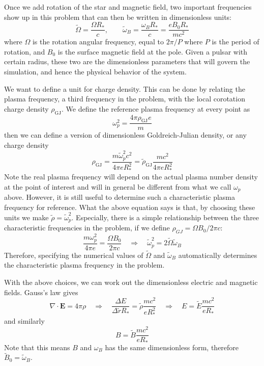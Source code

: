 Once we add rotation of the star and magnetic field, two important frequencies
show up in this problem that can then be written in dimensionless units:
\begin{equation}
  \tilde{\Omega} = \frac{\Omega R_{*}}{c},\qquad \tilde{\omega}_B = \frac{\omega_BR_{*}}{c} = \frac{e B_0R_{*}}{mc^2}
\end{equation}
where $\Omega$ is the rotation angular frequency, equal to $2\pi / P$ where $P$ is the period of rotation, and $B_0$ is the surface magnetic field at the pole. Given a pulsar with certain radius, these two are the dimensionless parameters that will govern the simulation, and hence the physical behavior of the system.

We want to define a unit for charge density. This can be done by relating the
plasma frequency, a third frequency in the problem, with the local corotation
charge density $\rho_\mathrm{GJ}$. We define the reference plasma frequency at every
point as
\begin{equation}
  \omega_p^2 = \frac{4\pi \rho_\mathrm{GJ}e}{m}
\end{equation}
then we can define a version of dimensionless Goldreich-Julian density, or any charge density
\begin{equation}
  \rho_\mathrm{GJ} = \frac{m \tilde{\omega}_p^2 c^2}{4\pi e R_{*}^2} = \tilde{\rho}_\mathrm{GJ} \frac{mc^2}{4\pi eR_{*}^2}
\end{equation}
Note the real plasma frequency will depend on the actual plasma number density
at the point of interest and will in general be different from what we call
$\omega_p$ above. However, it is still useful to determine such a characteristic
plasma frequency for reference. What the above equation says is that, by
choosing these units we make $\tilde{\rho} = \tilde{\omega}_p^2$. Especially,
there is a simple relationship between the three characteristic frequencies in
the problem, if we define $\rho_{GJ} = \Omega B_0 / 2\pi c$:
\begin{equation}
  \frac{m \omega_p^2}{4\pi e} = \frac{\Omega B_0}{2\pi c} \quad \Longrightarrow \quad \tilde{\omega}_p^2 = 2\tilde{\Omega} \tilde{\omega}_B
\end{equation}
Therefore, specifying the numerical values of $\tilde{\Omega}$ and
$\tilde{\omega}_B$ automatically determines the characteristic plasma frequency
in the problem.

With the above choices, we can work out the dimensionless electric and magnetic
fields. Gauss's law gives
\begin{equation}
  \nabla\cdot \mathbf{E} = 4\pi \rho \quad \Longrightarrow \quad \frac{\Delta E}{\Delta \tilde{r} R_{*}} = \tilde{\rho} \frac{m c^2}{e R_{*}^2} \quad \Longrightarrow \quad E = \tilde{E}\frac{m c^2}{e R_{*}}
\end{equation}
and similarly
\begin{equation}
    B = \tilde{B}\frac{m c^2}{e R_{*}}
\end{equation}
Note that this means $B$ and $\omega_B$ has the same dimensionless form,
therefore $\tilde{B}_0 = \tilde{\omega}_B$.

